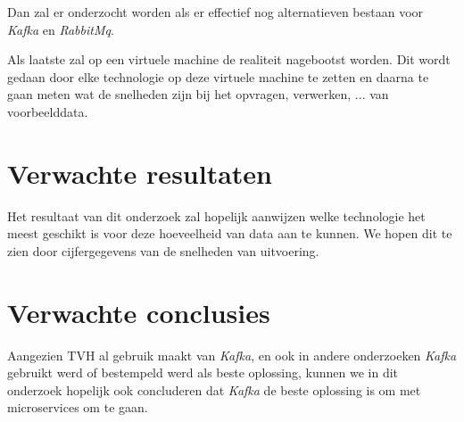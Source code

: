 Dan zal er onderzocht worden als er effectief nog alternatieven bestaan voor \emph{Kafka} en \emph{RabbitMq}.

Als laatste zal op een virtuele machine de realiteit nagebootst worden. Dit wordt gedaan door elke technologie op deze virtuele machine te zetten en daarna te gaan meten wat de snelheden zijn bij het opvragen, verwerken, ... van voorbeelddata.

\section{Verwachte resultaten}
\label{sec:verwachte_resultaten}
Het resultaat van dit onderzoek zal hopelijk aanwijzen welke technologie het meest geschikt is voor deze hoeveelheid van data aan te kunnen. We hopen dit te zien door cijfergegevens van de snelheden van uitvoering. 


\section{Verwachte conclusies}
\label{sec:verwachte_conclusies}

Aangezien TVH al gebruik maakt van \emph{Kafka}, en ook in andere onderzoeken \emph{Kafka} gebruikt werd of bestempeld werd als beste oplossing, kunnen we in dit onderzoek hopelijk ook concluderen dat \emph{Kafka} de beste oplossing is om met microservices om te gaan.

